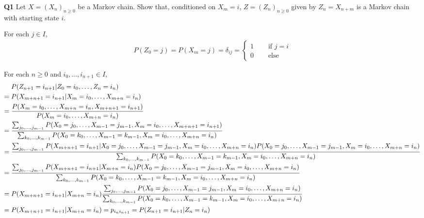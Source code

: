 \documentclass[hidelinks, 12pt]{article}
\theoremstyle{mydefstyle}
\theoremstyle{mythmstyle}
\begin{document}
\textbf{Q1} Let $X = (X_n)_{n \ge 0}$ be a Markov chain. Show that, conditioned on $X_m = i$, $Z = (Z_n)_{n \ge 0}$ given by $Z_n = X_{n+m}$ is a Markov chain with starting state $i$. 

For each $j \in I$,
\begin{gather*}
P(Z_0 = j) = P(X_m = j) = \delta_{ij} = \begin{cases}
1 \quad&\mbox{ if $j = i$} \\
0 \quad&\mbox{ else}
\end{cases}
\end{gather*}

For each $n \ge 0$ and $i_0, \dots, i_{n+1} \in I$,
\begin{align*}
&\hspace{1mm} P(Z_{n+1} = i_{n+1} \vert Z_0 = i_0, \dots, Z_n = i_n) \\
=&\hspace{1mm} P(X_{m+n+1} = i_{n+1} \vert X_m = i_0, \dots, X_{m+n} = i_{n}) \\
=&\hspace{1mm} \frac{P(X_m = i_0, \dots, X_{m+n} = i_n, X_{m+n+1} = i_{n+1})}{P(X_m = i_0, \dots, X_{m+n} = i_n)} \\
=&\hspace{1mm} \frac {\sum_{j_0, \dots, j_{m-1}} P(X_0 = j_0, \dots, X_{m-1} = j_{m-1}, X_m = i_0, \dots, X_{m+n+1} = i_{n+1}) } {\sum_{k_0, \dots, k_{m-1}} P(X_0 = k_0, \dots, X_{m-1} = k_{m-1}, X_m = i_0, \dots, X_{m+n} = i_n)} \\
=&\hspace{1mm} \frac {\sum_{j_0, \dots, j_{m-1}} P(X_{m+n+1} = i_{n+1} \vert X_0 = j_0, \dots, X_{m-1} = j_{m-1}, X_m = i_0, \dots, X_{m+n} = i_n) P(X_0 = j_0, \dots, X_{m-1} = j_{m-1}, X_m = i_0, \dots, X_{m+n} = i_n) } {\sum_{k_0, \dots, k_{m-1}} P(X_0 = k_0, \dots, X_{m-1} = k_{m-1}, X_m = i_0, \dots, X_{m+n} = i_n)} \\
=&\hspace{1mm} \frac {\sum_{j_0, \dots, j_{m-1}} P(X_{m+n+1} = i_{n+1} \vert X_{m+n} = i_n) P(X_0 = j_0, \dots, X_{m-1} = j_{m-1}, X_m = i_0, \dots, X_{m+n} = i_n) } {\sum_{k_0, \dots, k_{m-1}} P(X_0 = k_0, \dots, X_{m-1} = k_{m-1}, X_m = i_0, \dots, X_{m+n} = i_n)} \\
=&\hspace{1mm} P(X_{m+n+1} = i_{n+1} \vert X_{m+n} = i_n) \frac {\sum_{j_0, \dots, j_{m-1}} P(X_0 = j_0, \dots, X_{m-1} = j_{m-1}, X_m = i_0, \dots, X_{m+n} = i_n) } {\sum_{k_0, \dots, k_{m-1}} P(X_0 = k_0, \dots, X_{m-1} = k_{m-1}, X_m = i_0, \dots, X_{m+n} = i_n)} \\
=&\hspace{1mm} P(X_{m+n+1} = i_{n+1} \vert X_{m+n} = i_n) = p_{i_n i_{n+1}} = P(Z_{n+1} = i_{n+1} \vert Z_n = i_n)
\end{align*}
\end{document}
